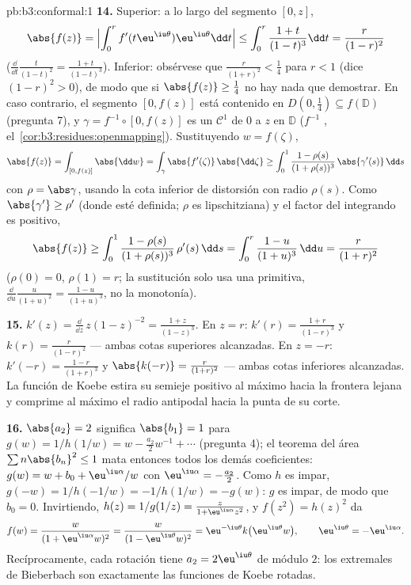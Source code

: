\begin{solution}{pb:b3:conformal:1}
\textbf{14.} Superior: a lo largo del segmento $[0, z]$,
\[
\abs{f(z)} = \Bigl|\int_0^rf'(t\eu^{\iu\theta})
\eu^{\iu\theta}\dd t\Bigr|
\leq \int_0^r\frac{1+t}{(1-t)^3}\dd t
= \frac{r}{(1-r)^2}
\]
($\frac{\dd}{\dd t}\frac t{(1-t)^2} = \frac{1+t}{(1-t)^3}$).
Inferior: obsérvese que $\frac r{(1+r)^2} < \frac14$ para $r < 1$ (dice
$(1-r)^2 > 0$), de modo que si $\abs{f(z)} \geq \frac14$ no hay nada que
demostrar. En caso contrario, el segmento $[0, f(z)]$ está contenido en
$D(0, \frac14) \subseteq f(\mathbb D)$ (pregunta 7), y
$\gamma = f^{-1}\circ[0, f(z)]$ es un
 $\mathcal C^1$ de $0$ a
$z$ en $\mathbb D$ ($f^{-1}$
,
el~\cref{cor:b3:residues:openmapping}). Sustituyendo $w =
f(\zeta)$,
\[
\abs{f(z)} = \int_{[0,f(z)]}\abs{\dd w}
= \int_\gamma\abs{f'(\zeta)}\,\abs{\dd\zeta}
\geq \int_0^1\frac{1 - \rho(s)}{(1 + \rho(s))^3}
\,\abs{\gamma'(s)}\,\dd s
\]
con $\rho = \abs\gamma$, usando la cota inferior de distorsión con radio
$\rho(s)$. Como $\abs{\gamma'} \geq \rho'$ (donde esté definida; $\rho$
es lipschitziana) y el factor del integrando es positivo,
\[
\abs{f(z)} \geq \int_0^1
\frac{1 - \rho(s)}{(1 + \rho(s))^3}\,\rho'(s)\,\dd s
= \int_0^{r}\frac{1 - u}{(1 + u)^3}\,\dd u
= \frac{r}{(1 + r)^2}
\]
($\rho(0) = 0$, $\rho(1) = r$; la sustitución solo usa una primitiva,
$\frac{\dd}{\dd u}\frac u{(1+u)^2} =
\frac{1-u}{(1+u)^3}$, no la monotonía).

\textbf{15.} $k'(z) = \frac{\dd}{\dd z}\,z(1 - z)^{-2} =
\frac{1 + z}{(1 - z)^3}$. En $z = r$: $k'(r) =
\frac{1+r}{(1-r)^3}$ y $k(r) = \frac r{(1-r)^2}$ --- ambas cotas
superiores alcanzadas. En $z = -r$: $k'(-r) =
\frac{1-r}{(1+r)^3}$ y $\abs{k(-r)} = \frac r{(1+r)^2}$ --- ambas cotas
inferiores alcanzadas. La función de Koebe estira su semieje positivo al
máximo hacia la frontera lejana y comprime al máximo el radio antipodal
hacia la punta de su corte.

\textbf{16.} $\abs{a_2} = 2$ significa $\abs{b_1} = 1$ para $g(w)
= 1/h(1/w) = w - \frac{a_2}2w^{-1} + \cdots$ (pregunta 4); el teorema
del área $\sum n\abs{b_n}^2 \leq 1$ mata entonces todos los demás
coeficientes: $g(w) = w + b_0 + \eu^{\iu\alpha}/w$ con
$\eu^{\iu\alpha} = -\frac{a_2}2$. Como $h$ es impar, $g(-w) =
1/h(-1/w) = -1/h(1/w) = -g(w)$: $g$ es impar, de modo que $b_0 = 0$.
Invirtiendo, $h(z) = 1/g(1/z) = \frac{z}{1 +
\eu^{\iu\alpha}z^2}$, y $f(z^2) = h(z)^2$ da
\[
f(w) = \frac{w}{(1 + \eu^{\iu\alpha}w)^2}
= \frac{w}{(1 - \eu^{\iu\theta}w)^2}
= \eu^{-\iu\theta}k\bigl(\eu^{\iu\theta}w\bigr),
\qquad \eu^{\iu\theta} = -\eu^{\iu\alpha} .
\]
Recíprocamente, cada rotación tiene $a_2 = 2\eu^{\iu\theta}$ de módulo
$2$: los extremales de Bieberbach son exactamente las funciones de Koebe
rotadas.


\end{solution}
